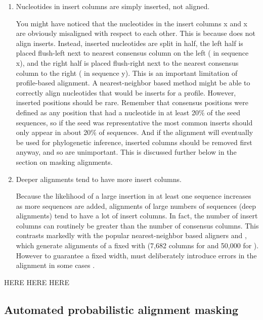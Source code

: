\begin{enumerate}
\item 
Nucleotides in insert columns are simply inserted, not aligned.

You might have noticed that the nucleotides in the insert columns x
and x are obviously misaligned with respect to each other. This is
because  does not align inserts. Instead, inserted
nucleotides are split in half, the left half is placed flush-left next
to nearest consensus column on the left ( in sequence x), and
the right half is placed flush-right next to the nearest consensus
column to the right ( in sequence y). This is an important
limitation of profile-based alignment. A nearest-neighbor based
method might be able to correctly align nucleotides that would be
inserts for a profile. However, inserted positions
should be rare. Remember that consensus positions were defined as any
position that had a nucleotide in at least 20\% of the seed
sequences, so if the seed was representative the most common inserts
should only appear in about 20\% of sequences. And if the alignment will
eventually be used for phylogenetic inference, inserted columns should
be removed first anyway, and so are unimportant. This is discussed
further below in the section on masking alignments.

\item 
Deeper alignments tend to have more insert columns. 

Because the likelihood of a large insertion in at least one sequence
increases as more sequences are added, alignments of large numbers of
sequences (deep alignments) tend to have a lot of insert columns. In
fact, the number of insert columns can routinely be greater than the
number of consensus columns. This contrasts markedly with the popular
nearest-neighbor based aligners  and , which
generate alignments of a fixed with (7,682 columns for  and
50,000 for ). However to guarantee a fixed width, 
must deliberately introduce errors in the alignment in some cases
\cite{DeSantis06}. 

\end{enumerate}

HERE HERE HERE

\subsection{Automated probabilistic alignment masking}

